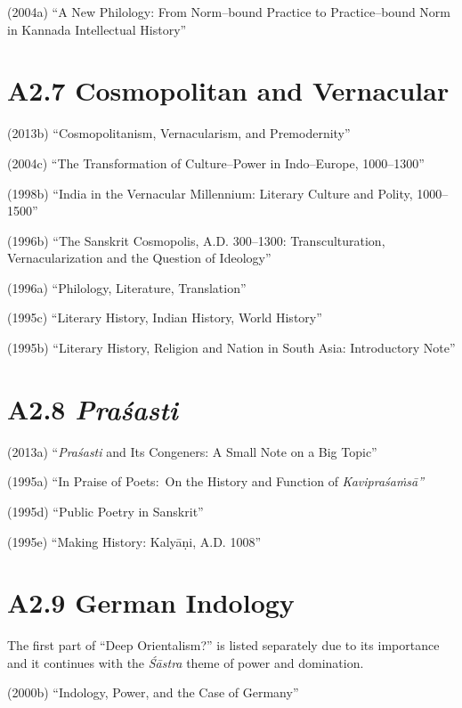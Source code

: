(2004a) “A New Philology: From Norm–bound Practice to Practice–bound Norm in Kannada Intellectual History”

\vspace{-.3cm}

\section*{A2.7 Cosmopolitan and Vernacular}

(2013b) “Cosmopolitanism, Vernacularism, and Premodernity”

(2004c) “The Transformation of Culture–Power in Indo–Europe, 1000–1300”

(1998b) “India in the Vernacular Millennium: Literary Culture and Polity, 1000–1500”

(1996b) “The Sanskrit Cosmopolis, A.D. 300–1300: Transculturation, Vernacularization and the Question of Ideology”

(1996a) “Philology, Literature, Translation”

(1995c) “Literary History, Indian History, World History”

(1995b) “Literary History, Religion and Nation in South Asia: Introductory Note”

\vspace{-.4cm}

\section*{A2.8 {\it {\bfseries Praśasti}}}

(2013a) “\textit{Praśasti} and Its Congeners: A Small Note on a Big Topic”

(1995a) “In Praise of Poets:~On the History and Function of \textit{Kavipraśaṁsā”}

(1995d) “Public Poetry in Sanskrit”

(1995e) “Making History: Kalyāṇi, A.D. 1008”

\vspace{-.4cm}

\section*{A2.9 German Indology}

The first part of “Deep Orientalism?” is listed separately due to its importance and it continues with the \textit{Śāstra} theme of power and domination.

(2000b) “Indology, Power, and the Case of Germany”

